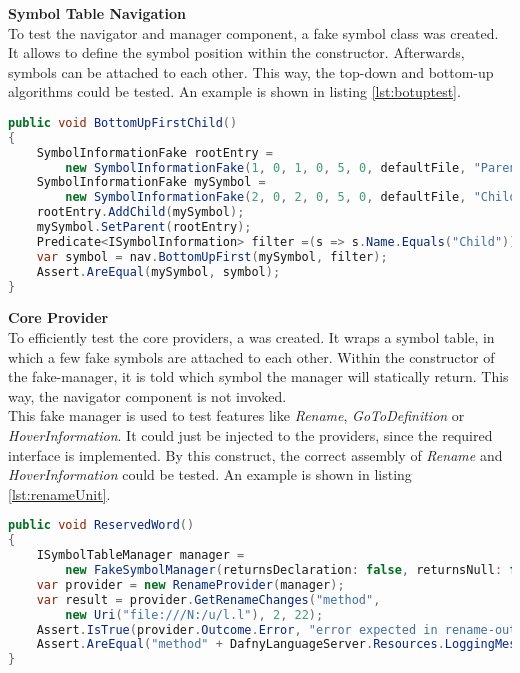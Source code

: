\textbf{Symbol Table Navigation}\\
To test the navigator and manager component, a fake symbol class was created.
It allows to define the symbol position within the constructor.
Afterwards, symbols can be attached to each other.
This way, the top-down and bottom-up algorithms could be tested.
An example is shown in listing \ref{lst:botuptest}.

\begin{lstlisting}[language=csharp, caption={Navigator Unit Test}, captionpos=b, label={lst:botuptest}]
public void BottomUpFirstChild()
{
    SymbolInformationFake rootEntry =
        new SymbolInformationFake(1, 0, 1, 0, 5, 0, defaultFile, "Parent");
    SymbolInformationFake mySymbol =
        new SymbolInformationFake(2, 0, 2, 0, 5, 0, defaultFile, "Child");
    rootEntry.AddChild(mySymbol);
    mySymbol.SetParent(rootEntry);
    Predicate<ISymbolInformation> filter =(s => s.Name.Equals("Child"));
    var symbol = nav.BottomUpFirst(mySymbol, filter);
    Assert.AreEqual(mySymbol, symbol);
}
\end{lstlisting}

\textbf{Core Provider}\\
To efficiently test the core providers, a  was created.
It wraps a symbol table, in which a few fake symbols are attached to each other.
Within the constructor of the fake-manager, it is told which symbol the manager will statically return.
This way, the navigator component is not invoked.\\

This fake manager is used to test features like \textit{Rename}, \textit{GoToDefinition} or \textit{HoverInformation}.
It could just be injected to the providers, since the required interface  is implemented.
By this construct, the correct assembly of \textit{Rename} and \textit{HoverInformation} could be tested.
An example is shown in listing \ref{lst:renameUnit}.

\begin{lstlisting}[language=csharp, caption={Core Provider Unit Test}, captionpos=b, label={lst:renameUnit}]
public void ReservedWord()
{
    ISymbolTableManager manager =
        new FakeSymbolManager(returnsDeclaration: false, returnsNull: false);
    var provider = new RenameProvider(manager);
    var result = provider.GetRenameChanges("method",
        new Uri("file:///N:/u/l.l"), 2, 22);
    Assert.IsTrue(provider.Outcome.Error, "error expected in rename-outcome");
    Assert.AreEqual("method" + DafnyLanguageServer.Resources.LoggingMessages.rename_reserved_word, provider.Outcome.Msg);
}
\end{lstlisting}

